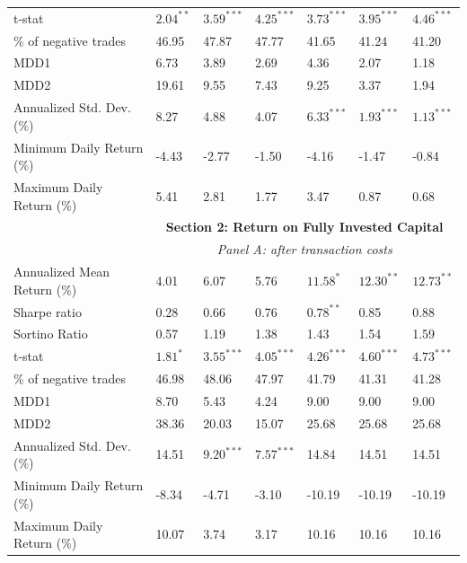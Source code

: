 \begin{threeparttable}[H]
\begin{tabularx}{\textwidth}{@{\extracolsep{\fill}}lllllll@{}}
		t-stat & $2.04^{**}$  & $3.59^{***}$  & $4.25^{***}$  & $3.73^{***}$  & $3.95^{***}$  & $4.46^{***}$ \\
		\% of negative trades & 46.95 & 47.87 & 47.77 & 41.65 & 41.24 & 41.20 \\
		MDD1  & 6.73  & 3.89  & 2.69  & 4.36  & 2.07  & 1.18 \\
		MDD2  & 19.61 & 9.55  & 7.43  & 9.25  & 3.37  & 1.94 \\
		Annualized Std. Dev. (\%) & 8.27  & 4.88  & 4.07  & $6.33^{***}$  & $1.93^{***}$  & $1.13^{***}$ \\
		Minimum Daily Return (\%) & -4.43 & -2.77 & -1.50 & -4.16 & -1.47 & -0.84 \\
		Maximum Daily Return (\%) & 5.41  & 2.81  & 1.77  & 3.47  & 0.87  & 0.68 \\
		\midrule
& \multicolumn{6}{c}{\textbf{Section 2: Return on Fully Invested Capital}} \\
& \multicolumn{6}{c}{\textit {Panel A: after transaction costs}} \\
		Annualized Mean Return (\%) & 4.01  & 6.07  & 5.76  & $11.58^{*}$ & $12.30^{**}$ & $12.73^{**}$ \\
		Sharpe ratio & 0.28  & 0.66  & 0.76  & $0.78^{**}$  & 0.85  & 0.88 \\
		Sortino Ratio & 0.57  & 1.19  & 1.38  & 1.43  & 1.54  & 1.59 \\
		t-stat & $1.81^{*}$  & $3.55^{***}$  & $4.05^{***}$  & $4.26^{***}$  & $4.60^{***}$  & $4.73^{***}$ \\
		\% of negative trades & 46.98 & 48.06 & 47.97 & 41.79 & 41.31 & 41.28 \\
		MDD1  & 8.70  & 5.43  & 4.24  & 9.00  & 9.00  & 9.00 \\
		MDD2  & 38.36 & 20.03 & 15.07 & 25.68 & 25.68 & 25.68 \\
		Annualized Std. Dev. (\%) & 14.51 & $9.20^{***}$  & $7.57^{***}$  & 14.84 & 14.51 & 14.51 \\
		Minimum Daily Return (\%) & -8.34 & -4.71 & -3.10 & -10.19 & -10.19 & -10.19 \\
		Maximum Daily Return (\%) & 10.07 & 3.74  & 3.17  & 10.16 & 10.16 & 10.16 \\

\end{tabularx}
\end{threeparttable}
